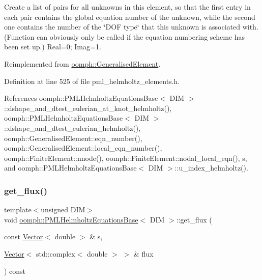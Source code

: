 Create a list of pairs for all unknowns in this element, so that the first entry in each pair contains the global equation number of the unknown, while the second one contains the number of the \char`\"{}\+D\+O\+F type\char`\"{} that this unknown is associated with. (Function can obviously only be called if the equation numbering scheme has been set up.) Real=0; Imag=1. 



Reimplemented from \hyperlink{classoomph_1_1GeneralisedElement_a069f59bfc3e607a5bebba52c6314d777}{oomph\+::\+Generalised\+Element}.



Definition at line 525 of file pml\+\_\+helmholtz\+\_\+elements.\+h.



References oomph\+::\+P\+M\+L\+Helmholtz\+Equations\+Base$<$ D\+I\+M $>$\+::dshape\+\_\+and\+\_\+dtest\+\_\+eulerian\+\_\+at\+\_\+knot\+\_\+helmholtz(), oomph\+::\+P\+M\+L\+Helmholtz\+Equations\+Base$<$ D\+I\+M $>$\+::dshape\+\_\+and\+\_\+dtest\+\_\+eulerian\+\_\+helmholtz(), oomph\+::\+Generalised\+Element\+::eqn\+\_\+number(), oomph\+::\+Generalised\+Element\+::local\+\_\+eqn\+\_\+number(), oomph\+::\+Finite\+Element\+::nnode(), oomph\+::\+Finite\+Element\+::nodal\+\_\+local\+\_\+eqn(), s, and oomph\+::\+P\+M\+L\+Helmholtz\+Equations\+Base$<$ D\+I\+M $>$\+::u\+\_\+index\+\_\+helmholtz().

\mbox{\label{classoomph_1_1PMLHelmholtzEquationsBase_a255447874c4f8477e5358a253462bb62}} 
\subsubsection{\texorpdfstring{get\+\_\+flux()}{get\_flux()}}
{\footnotesize\ttfamily template$<$unsigned D\+IM$>$ \\
void \hyperlink{classoomph_1_1PMLHelmholtzEquationsBase}{oomph\+::\+P\+M\+L\+Helmholtz\+Equations\+Base}$<$ D\+IM $>$\+::get\+\_\+flux (\begin{DoxyParamCaption}\item[{const \hyperlink{classoomph_1_1Vector}{Vector}$<$ double $>$ \&}]{s,  }\item[{\hyperlink{classoomph_1_1Vector}{Vector}$<$ std\+::complex$<$ double $>$ $>$ \&}]{flux }\end{DoxyParamCaption}) const\hspace{0.3cm}{\ttfamily [inline]}}



